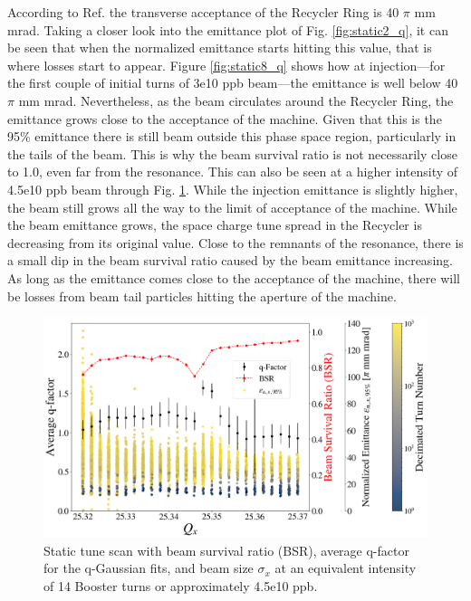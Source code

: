 According to Ref. \cite{rr0} the transverse acceptance of the Recycler Ring is 40 $\pi$ mm mrad. Taking a closer look into the emittance plot of Fig. \ref{fig:static2_q}, it can be seen that when the normalized emittance starts hitting this value, that is where losses start to appear. Figure \ref{fig:static8_q} shows how at injection---for the first couple of initial turns of 3e10 ppb beam---the emittance is well below 40 $\pi$ mm mrad. Nevertheless, as the beam circulates around the Recycler Ring, the emittance grows close to the acceptance of the machine. Given that this is the 95\% emittance there is still beam outside this phase space region, particularly in the tails of the beam. This is why the beam survival ratio is not necessarily close to 1.0, even far from the resonance. This can also be seen at a higher intensity of 4.5e10 ppb beam through Fig. \ref{fig:static14_q}. While the injection emittance is slightly higher, the beam still grows all the way to the limit of acceptance of the machine. While the beam emittance grows, the space charge tune spread in the Recycler is decreasing from its original value. Close to the remnants of the resonance, there is a small dip in the beam survival ratio caused by the beam emittance increasing. As long as the emittance comes close to the acceptance of the machine, there will be losses from beam tail particles hitting the aperture of the machine. 

\begin{figure}[H]
    \centering
    \includegraphics[width=\columnwidth]{chapter6/static14turns_emittance_dampersOFF.png}
    \caption{Static tune scan with beam survival ratio (BSR), average q-factor for the q-Gaussian fits, and beam size $\sigma_x$ at an equivalent intensity of 14 Booster turns or approximately 4.5e10 ppb.}
    \label{fig:static14_q}
\end{figure}


